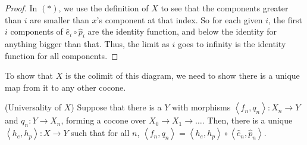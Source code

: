 \begin{proof}
In $(*)$, we use the definition of $X$ to see that the components
greater than $i$ are smaller than $x$'s component at that index. So
for each given $i$, the first $i$ components of $\hat{e}_i \circ
\hat{p}_i$ are the identity function, and below the identity for
anything bigger than that. Thus, the limit as $i$ goes to infinity is
the identity function for all components. 


\end{proof}

To show that $X$ is the colimit of this diagram, we need to show there
is a unique map from it to any other cocone. 

\begin{lemma}{(Universality of $X$)} 
Suppose that there is a $Y$ with morphisms $\left<f_n, q_n\right> : X_n
\to Y$ and $q_n : Y \to X_n$, forming a cocone over $X_0 \longrightarrow
X_1 \longrightarrow \ldots$. Then, there is a unique 
$\left<h_e,h_p\right> : X \to Y$ such that for all $n$, 
$\left<f_n,q_n\right> = \left<h_e,h_p\right> \circ \left<\hat{e}_n, \hat{p}_n\right>$.
\end{lemma}

